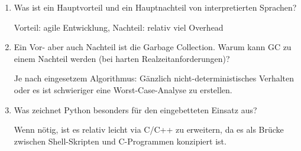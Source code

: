 \begin{enumerate}

  \item Was ist ein Hauptvorteil und ein Hauptnachteil von interpretierten Sprachen?

        Vorteil: agile Entwicklung, Nachteil: relativ viel Overhead

  \item Ein Vor- aber auch Nachteil ist die Garbage Collection. Warum kann GC zu einem Nachteil werden (bei harten Realzeitanforderungen)?

        Je nach eingesetzem Algorithmus: Gänzlich nicht-deterministisches
        Verhalten oder es ist schwieriger eine Worst-Case-Analyse zu erstellen.

  \item Was zeichnet Python besonders für den eingebetteten Einsatz aus?

        Wenn nötig, ist es relativ leicht via C/C++ zu erweitern, da es als
        Brücke zwischen Shell-Skripten und C-Programmen konzipiert ist.

\end{enumerate}
